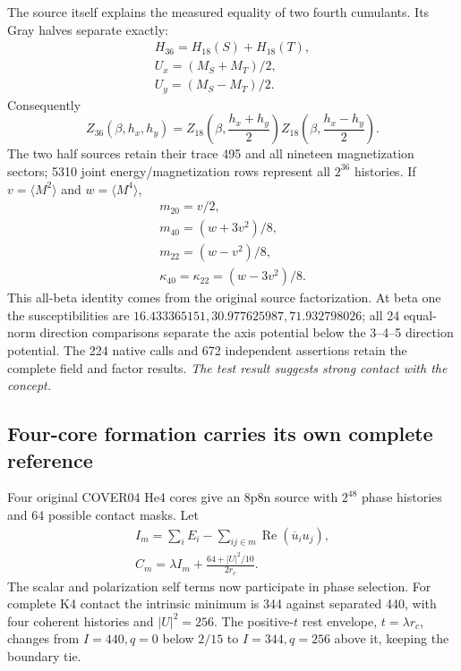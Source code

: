 The source itself explains the measured equality of two fourth cumulants.
Its Gray halves separate exactly:
\[
\begin{gathered}
H_{36}=H_{18}(S)+H_{18}(T),\\
 U_x=(M_S+M_T)/2,\\
 U_y=(M_S-M_T)/2.
\end{gathered}
\]
Consequently
\[
 Z_{36}(\beta,h_x,h_y)
 =Z_{18}\!\left(\beta,\frac{h_x+h_y}{2}\right)
  Z_{18}\!\left(\beta,\frac{h_x-h_y}{2}\right).
\]
The two half sources retain their trace 495 and all nineteen magnetization
sectors; 5310 joint energy/magnetization rows represent all \(2^{36}\)
histories. If \(v=\langle M^2\rangle\) and \(w=\langle M^4\rangle\),
\[
\begin{gathered}
m_{20}=v/2,\\
 m_{40}=(w+3v^2)/8,\\
 m_{22}=(w-v^2)/8,\\
 \kappa_{40}=\kappa_{22}=(w-3v^2)/8.
\end{gathered}
\]
This all-beta identity comes from the original source factorization.
At beta one the susceptibilities are
\(16.433365151,30.977625987,71.932798026\); all 24 equal-norm direction
comparisons separate the axis potential below the 3--4--5 direction
potential. The 224 native calls and 672 independent assertions retain
the complete field and factor results. \emph{The test result suggests
strong contact with the concept.}

\subsection{Four-core formation carries its own complete reference}

Four original COVER04 He4 cores give an 8p8n source with \(2^{48}\) phase
histories and 64 possible contact masks. Let
\[
\begin{gathered}
I_m=\sum_iE_i-\sum_{ij\in m}\operatorname{Re}(\overline u_i u_j),
 \\
 C_m=\lambda I_m+\frac{64+|U|^2/10}{2r_c}.
\end{gathered}
\]
The scalar and polarization self terms now participate in phase selection.
For complete K4 contact the intrinsic minimum is 344 against separated
440, with four coherent histories and \(|U|^2=256\). The positive-\(t\)
rest envelope, \(t=\lambda r_c\), changes from \(I=440,q=0\) below \(2/15\)
to \(I=344,q=256\) above it, keeping the boundary tie.

